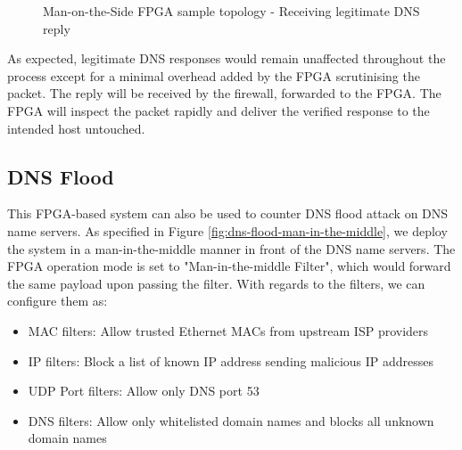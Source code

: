\documentclass[a4paper]{report}
\begin{document}
\begin{figure}[H]
  \caption{Man-on-the-Side FPGA sample topology - Receiving legitimate DNS reply}
\end{figure}

As expected, legitimate DNS responses would remain unaffected throughout the process except for a minimal overhead added by the FPGA scrutinising the packet. The reply will be received by the firewall, forwarded to the FPGA. The FPGA will inspect the packet rapidly and deliver the verified response to the intended host untouched.

\subsection{DNS Flood}

This FPGA-based system can also be used to counter DNS flood attack on DNS name servers. As specified in Figure \ref{fig:dns-flood-man-in-the-middle}, we deploy the system in a man-in-the-middle manner in front of the DNS name servers. The FPGA operation mode is set to "Man-in-the-middle Filter", which would forward the same payload upon passing the filter. With regards to the filters, we can configure them as:

\begin{itemize}
    \item MAC filters: Allow trusted Ethernet MACs from upstream ISP providers
    \item IP filters: Block a list of known IP address sending malicious IP addresses
    \item UDP Port filters: Allow only DNS port 53
    \item DNS filters: Allow only whitelisted domain names and blocks all unknown domain names
\end{itemize}
\end{document}
